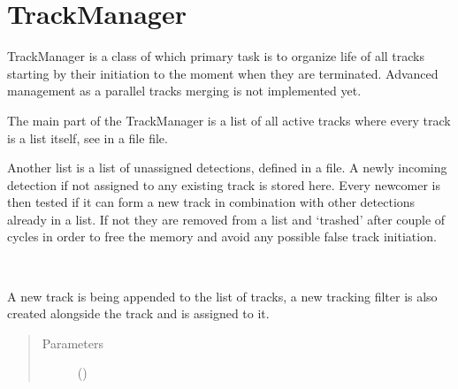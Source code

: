 \documentclass[letterpaper,10pt,english]{Reference manual}
\begin{document}
\section{TrackManager}
\label{\detokenize{trackmanagement:trackmanager}}
TrackManager is a class of which primary task is to organize life of all tracks starting by their initiation to
the moment when they are terminated. Advanced management as a parallel tracks merging is not implemented yet.

The main part of the TrackManager is a list of all active tracks where every track is a list itself, see
{\hyperref[\detokenize{datacontainers:data_containers.Track}]{}} in a file {\hyperref[\detokenize{datacontainers::doc}]{}} file.

Another list is a list of unassigned detections, {\hyperref[\detokenize{datacontainers:data_containers.UnAssignedDetectionList}]{}} defined in a
{\hyperref[\detokenize{datacontainers::doc}]{}} file. A newly incoming detection if not assigned to any existing track is
stored here. Every newcomer is then tested if it can form a new track in combination with other detections already
in a list. If not they are removed from a list and ‘trashed’ after couple of cycles in order to free the memory and avoid
any possible false track initiation.

\begin{fulllineitems}
\label{\detokenize{trackmanagement:track_management.TrackManager}}~

\begin{fulllineitems}
\label{\detokenize{trackmanagement:track_management.TrackManager.append_track}}
A new track is being appended to the list of tracks, a new tracking filter is also created
alongside the track and is assigned to it.
\begin{quote}\begin{description}
\item[{Parameters}] \leavevmode
{} ({\hyperref[\detokenize{datacontainers:data_containers.Track}]{}}) \textendash{} 

\end{description}\end{quote}

\end{fulllineitems}


\end{fulllineitems}
\end{document}
